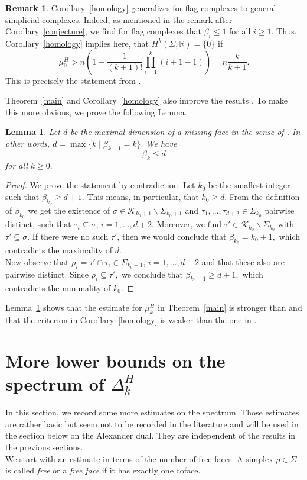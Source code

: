 \documentclass[10pt]{amsart}
\newtheorem{lemma}[theorem]{Lemma}
\theoremstyle{definition}
\newtheorem*{remark}{Remark}
\begin{document}
\begin{remark} Corollary~\ref{homology} generalizes \cite[Theorem~1.2]{AharoniBergerMeshulam} for flag complexes to general simplicial complexes. Indeed, as mentioned in the remark after Corollary~\ref{conjecture}, we find for flag complexes that $\beta_i\leq 1$ for all $i\geq 1.$ Thus, Corollary~\ref{homology} implies here, that $H^k(\Sigma,\mathbb{R})=\lbrace 0\rbrace$ if \[\mu^H_0> n\left(1-\frac{1}{(k+1)!}\prod_{i = 1}^k(i+1-1)\right) = n\frac{k}{k+1}.\] This is precisely the statement from \cite{AharoniBergerMeshulam}.
\end{remark} 

Theorem~\ref{main} and Corollary~\ref{homology} also improve the results \cite[Theorem~1.2 and Theorem~1.3]{lewgaps}. To make this more obvious, we prove the following Lemma.
\begin{lemma}\label{lew}
    Let $d$ be the maximal dimension of a \textit{missing face} in the sense of \cite{lewgaps}. In other words, $d = \max\lbrace k\mid\beta_{k-1} = k\rbrace.$
    We have \[\beta_k\leq d\]
    for all $k\geq 0.$
\end{lemma}
\begin{proof}
    We prove the statement by contradiction. Let $k_0$ be the smallest integer such that $\beta_{k_0}\geq d+1.$ This means, in particular, that $k_0\geq d.$ From the definition of $\beta_{k_0}$ we get the existence of $\sigma\in \mathcal{K}_{k_0+1}\backslash\Sigma_{k_0+1}$ and $\tau_1,\ldots,\tau_{d+2}\in\Sigma_{k_0}$ pairwise distinct, such that $\tau_i\subseteq\sigma$, $i = 1,\ldots,d+2.$ Moreover, we find $\tau'\in\mathcal{K}_{k_0}\backslash\Sigma_{k_0}$ with $\tau'\subseteq\sigma.$ If there were no such $\tau'$, then we would conclude that $\beta_{k_0} = k_0+1,$ which contradicts the maximality of $d.$\\
    Now observe that $\rho_i = \tau'\cap\tau_i\in\Sigma_{k_0-1}$, $i = 1,\ldots,d+2$ and that these also are pairwise distinct. Since $\rho_i\subseteq\tau',$ we conclude that $\beta_{k_0-1}\geq d+1,$ which contradicts the minimality of $k_0.$
\end{proof}
Lemma~\ref{lew} shows that the estimate for $\mu^H_k$ in Theorem~\ref{main} is stronger than \cite[Theorem~1.2]{lewgaps} and that the criterion in Corollary~\ref{homology} is weaker than the one in \cite[Theorem~1.3]{lewgaps}.
\section{More lower bounds on the spectrum of $\Delta^H_k$ }\label{morebounds}
In this section, we record some more estimates on the spectrum. Those estimates are rather basic but seem not to be recorded in the literature and will be used in the  section below on the Alexander dual. They are independent of the results in the previous sections.\\
We start with an estimate in terms of the number of free faces. A simplex $\rho\in\Sigma$ is called \textit{free} or a \textit{free face} if it has exactly one coface.
\end{document}
